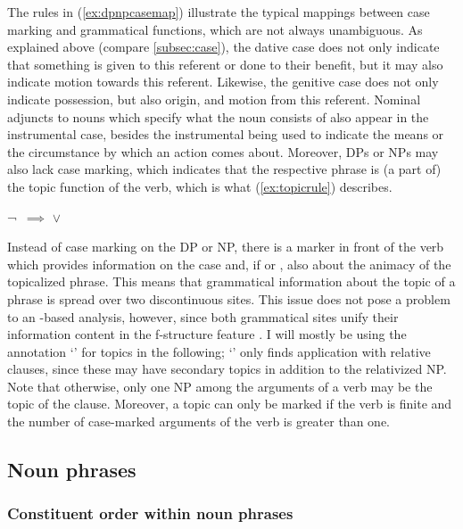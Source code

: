 The rules in (\ref{ex:dpnpcasemap}) illustrate the typical mappings between
case marking and grammatical functions, which are not always unambiguous. As
explained above (compare \autoref{subsec:case}), the dative case does not only
indicate that something is given to this referent or done to their benefit, but
it may also indicate motion towards this referent. Likewise, the genitive case
does not only indicate possession, but also origin, and motion from this
referent. Nominal adjuncts to nouns which specify what the noun consists of
also appear in the instrumental case, besides the instrumental being used to
indicate the means or the circumstance by which an action comes about.
Moreover, DPs or NPs may also lack case marking, which indicates that the
respective phrase is (a part of) the topic function of the verb, which is what
(\ref{ex:topicrule}) describes.

\ex\label{ex:topicrule}
¬\,\downs{\Case} $\implies$ \pass{\Top} $\vee$ \elem{\Top}
\xe

Instead of case marking on the DP or NP, there is a marker in front of the verb
which provides information on the case and, if \AgtT{} or \PatT{}, also about
the animacy of the topicalized phrase. This means that grammatical information
about the topic of a phrase is spread over two discontinuous sites. This issue
does not pose a problem to an \Lfg{}-based analysis, however, since both
grammatical sites unify their information content in the f-structure feature
\Top{}. I will mostly be using the annotation `\pass{\Top}' for topics in the
following; `\elem{\Top}' only finds application with relative clauses, since
these may have secondary topics in addition to the relativized NP. Note that
otherwise, only one NP among the arguments of a verb may be the topic of the
clause. Moreover, a topic can only be marked if the verb is finite and the
number of case-marked arguments of the verb is greater than one.

\subsection{Noun phrases}
\label{subsec:nps}

\subsubsection{Constituent order within noun phrases}

